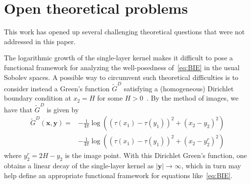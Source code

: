 \documentclass[review,hidelinks,onefignum,onetabnum]{siamart220329}
\newcommand{\bx}{\mathbf{x}}
\newcommand{\by}{\mathbf{y}}
\newcommand{\de}{\,\mathrm{d}}
\begin{document}




\section{Open theoretical problems}
This work has opened up several challenging theoretical questions that were not addressed in this paper. 

The logarithmic growth of the single-layer kernel makes it difficult to pose a functional framework for analyzing the well-posedness of~\cref{eq:BIE} in the usual Sobolev spaces. 
A possible way to circumvent such theoretical difficulties is to consider instead a Green's function $\widetilde{G}^D$ satisfying a (homogeneous) Dirichlet boundary condition at $x_2 = H$ for some $H>0$~\cite{preston2008integral}. By the method of images, we have that $\widetilde{G}^D$ is given by
\begin{align}
    \label{eq:dirichlet-green-function}
    \widetilde{G}^D(\bx,\by) = &-\frac{1}{4\pi}\log \left((\tau(x_1) - \tau(y_1))^2 + (x_2 - y_2)^2\right) \\
    &- \frac{1}{4\pi}\log \left((\tau(x_1) - \tau(y_1))^2 + (x_2 - y_2^r)^2 \right) \nonumber
\end{align}
where $y_2^r = 2H - y_2$ is the image point. With this Dirichlet Green's function, one obtains a linear decay of the single-layer kernel as $|\by| \to \infty$, which in turn may help define an appropriate functional framework for equations like~\cref{eq:BIE}. 
\end{document}
